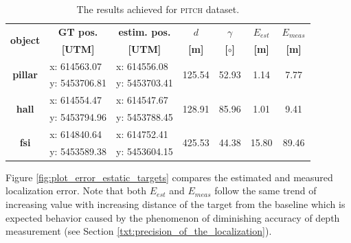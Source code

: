 \begin{table}[!h]
	\centering
	\caption{The results achieved for \textsc{pitch} dataset.}
	\begin{tabular}{crrcccc}
		\toprule
		\multirow{2}[0]{*}{\textbf{object}} & \multicolumn{1}{c}{\textbf{GT pos.}} & \multicolumn{1}{c}{\textbf{estim. pos. }} & \textbf{$d$} & \textbf{$\gamma$} & \textbf{$E_{est}$} & \textbf{$E_{meas}$} \\
		\textbf{} & \multicolumn{1}{c}{\textbf{[UTM]}} & \multicolumn{1}{c}{\textbf{[UTM]}} & \textbf{[m]} & \textbf{[$\circ$]} & \textbf{[m]} & \textbf{[m]} \\
		\midrule
		\multirow{2}[0]{*}{\textbf{pillar}} & \multicolumn{1}{l}{x: 614563.07} & \multicolumn{1}{l}{x: 614556.08} & \multirow{2}[0]{*}{125.54} & \multirow{2}[0]{*}{52.93} & \multirow{2}[0]{*}{1.14} & \multirow{2}[0]{*}{7.77} \\
		& \multicolumn{1}{l}{y: 5453706.81} & \multicolumn{1}{l}{y: 5453703.41} &       &       &       &  \\
		\multirow{2}[0]{*}{\textbf{hall}} & \multicolumn{1}{l}{x: 614554.47} & \multicolumn{1}{l}{x: 614547.67} & \multirow{2}[0]{*}{128.91} & \multirow{2}[0]{*}{85.96} & \multirow{2}[0]{*}{1.01} & \multirow{2}[0]{*}{9.41} \\
		& \multicolumn{1}{l}{y: 5453794.96} & \multicolumn{1}{l}{y: 5453788.45} &       &       &       &  \\
		\multirow{2}[0]{*}{\textbf{fsi}} & \multicolumn{1}{l}{x: 614840.64} & \multicolumn{1}{l}{x: 614752.41} & \multirow{2}[0]{*}{425.53} & \multirow{2}[0]{*}{44.38} & \multirow{2}[0]{*}{15.80} & \multirow{2}[0]{*}{89.46} \\
		& \multicolumn{1}{l}{y: 5453589.38} & \multicolumn{1}{l}{y: 5453604.15} &       &       &       &  \\
		\bottomrule
	\end{tabular}
	\label{tab:static_targets_vut_pitch}
\end{table}

Figure \ref{fig:plot_error_estatic_targets} compares the estimated and measured localization error. Note that both $E_{est}$ and $E_{meas}$ follow the same trend of increasing value with increasing distance of the target from the baseline which is expected behavior caused by the phenomenon of diminishing accuracy of depth measurement (see Section \ref{txt:precision_of_the_localization}). 

